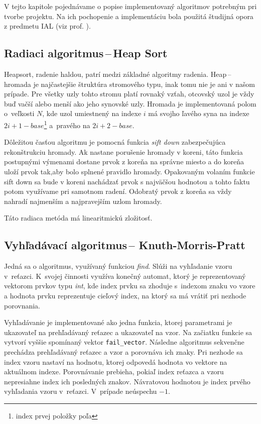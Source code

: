 \documentclass[11pt,a4paper]{article}
\begin{document}
    V tejto kapitole pojednávame o popise implementovaný algoritmov potrebným pri tvorbe projektu. Na ich pochopenie a implementáciu bola použitá študijná opora z predmetu IAL (viz prof. \cite{opora}).

	\subsection{Radiaci algoritmus\,--\,Heap Sort}

	Heapsort, radenie haldou, patrí medzi základné algoritmy radenia. Heap\,--\,hromada je
    najčastejšie štruktúra stromového typu, inak tomu nie je ani v našom prípade.
    Pre všetky uzly tohto stromu platí rovnaký vzťah, otcovský uzol je vždy buď
    vačší alebo menší ako jeho synovské uzly. Hromada je implementovaná polom o~veľkosti $N$,
    kde uzol umiestnený na indexe $i$ má svojho ľavého syna na indexe
    $2i+1-base$\footnote{index prvej položky poľa} a~pravého na $2i+2-base$.

	Dôležitou časťou algoritmu je pomocná funkcia \textit{sift down} zabezpečujúca rekonštrukciu hromady. Ak nastane porušenie hromady v koreni, táto funkcia postupnými výmenami dostane prvok z koreňa na správne miesto a do koreňa uloží prvok tak,aby bolo splnené pravidlo hromady. Opakovaným volaním funkcie sift down sa bude v koreni nachádzať prvok s najväčšou hodnotou a tohto faktu potom využívame pri samotnom radení. Odobratý prvok z koreňa sa vždy nahradí najmenším a najpravejším uzlom hromady.

	Táto radiaca metóda má linearitmickú zložitosť.

	\subsection{Vyhľadávací algoritmus\,-- Knuth-Morris-Pratt}

	Jedná sa o algoritmus, využívaný funkciou \textit{find}. Slúži na vyhľadanie vzoru v~reťazci. K~svojej činnosti využíva konečný automat, ktorý je reprezentovaný vektorom prvkov typu \textit{int}, kde index prvku sa zhoduje s~indexom znaku vo vzore a hodnota prvku reprezentuje cieľový index, na ktorý sa má vrátiť pri nezhode porovnania.

	Vyhľadávanie je implementované ako jedna funkcia, ktorej parametrami je ukazovateľ na prehľadávaný reťazec a ukazovateľ na vzor. Na začiatku funkcie sa vytvorí vyššie spomínaný vektor \texttt{fail\_vector}. Následne algoritmus sekvenčne prechádza prehľadávaný reťazec a vzor a porovnáva ich znaky. Pri nezhode sa index vzoru nastaví na hodnotu, ktorej odpovedá hodnota vo vektore na aktuálnom indexe. Porovnávanie prebieha, pokiaľ index reťazca a vzoru nepresiahne	index ich posledných znakov. Návratovou hodnotou je index prvého vyhľadania vzoru v~reťazci. V~prípade neúspechu $-1$.
\end{document}
